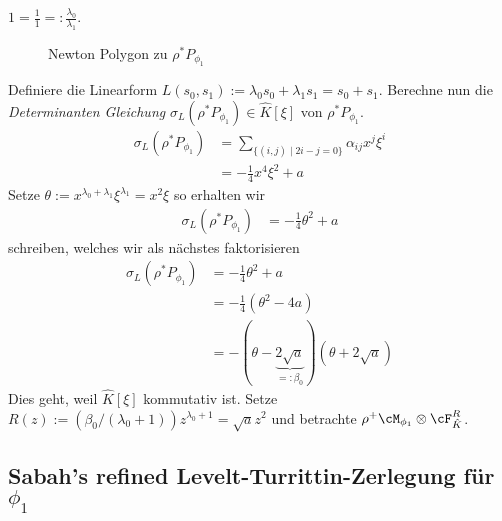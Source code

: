 $1=\frac{1}{1}=:\frac{\lambda_0}{\lambda_1}$.
\begin{figure}[H]
\caption{Newton Polygon zu $\rho^*P_{\phi_1}$}
\begin{center}
\end{center}
\end{figure}
Definiere die Linearform $L(s_0,s_1):=\lambda_0s_0+\lambda_1s_1=s_0+s_1$.
Berechne nun die \emph{Determinanten Gleichung} $\sigma_L(\rho^*P_{\phi_1})\in
\hat K[\xi]$ von $\rho^*P_{\phi_1}$.
\begin{align*}
\sigma_L(\rho^*P_{\phi_1})
  &= \sum_{\{(i,j)\mid 2i-j=0\}}\alpha_{ij}x^{j}\xi^i\\
  &= -\frac{1}{4}x^4\xi^2 + a
\end{align*}
Setze $\theta:=x^{\lambda_0+\lambda_1}\xi^{\lambda_1}=x^2\xi$ so erhalten wir
\begin{align*}
\sigma_L(\rho^*P_{\phi_1}) &= -\frac{1}{4}\theta^2 + a
\end{align*}
schreiben, welches wir als nächstes faktorisieren
\begin{align*}
\sigma_L(\rho^*P_{\phi_1}) &= -\frac{1}{4}\theta^2+a\\
  &=-\frac{1}{4}(\theta^2-4a)\\
  &=-(\theta-\underset{=:\beta_0}{\underbrace{2\sqrt{a}}})(\theta+2\sqrt{a})
\end{align*}
Dies geht, weil $\hat K[\xi]$ kommutativ ist.
Setze $R(z):=(\beta_0/(\lambda_0+1))z^{\lambda_0+1}=\sqrt{a}z^2$ und betrachte
$\rho^+\cM_{\phi_1}\otimes\cF_{\hat K}^R$.
\begin{comment}
BIS HIER HIN KORREGIERT: $P_\phi$ ist im folgendem FALSCH
\end{comment}

\subsection{Sabah's refined Levelt-Turrittin-Zerlegung für $\phi_1$}

